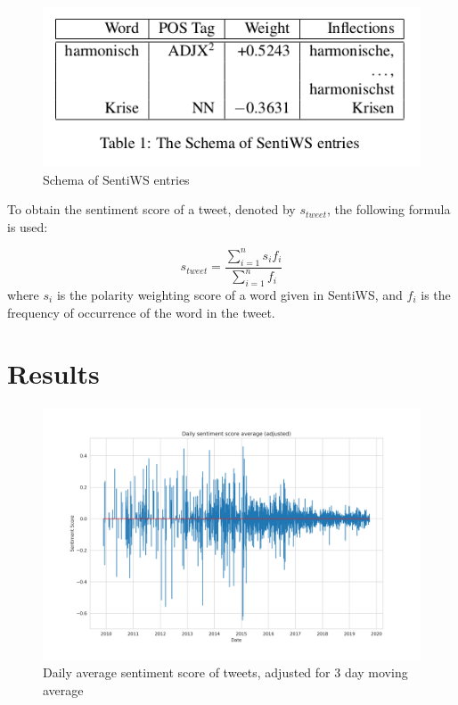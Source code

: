 \documentclass[10pt,twocolumn,twoside,lineno]{pnas-new}
\begin{document}
\begin{figure} 
	\begin{center}
		\includegraphics[width=\linewidth]{figures/sentiws_example}
	\end{center}
	\caption{Schema of SentiWS entries}
	\label{fig:sentiws_example}
\end{figure}

To obtain the sentiment score of a tweet, denoted by \(s_{tweet}\), the following formula is used: 

\begin{equation}
\label{eq:word_score}
s_{tweet} = \frac{\sum_{i=1}^{n} s_i f_i}{\sum_{i=1}^{n} f_i}
\end{equation} 
where \(s_i\) is the polarity weighting score of a word given in SentiWS, and \(f_i\) is the frequency of occurrence of the word in the tweet. 



\section*{Results} \label{sec:results}

\begin{figure} 
	\begin{center}
		\includegraphics[width=\linewidth]{figures/dailyavgsenti_adjusted}
	\end{center}
	\caption{Daily average sentiment score of tweets, adjusted for 3 day moving average}
	\label{fig:tweet_score_adjusted}
\end{figure}
\end{document}
